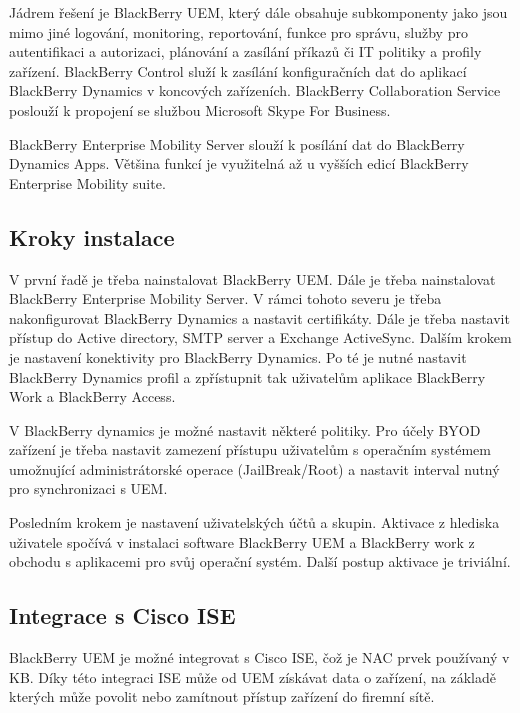 Jádrem řešení je BlackBerry UEM, který dále obsahuje subkomponenty jako jsou mimo jiné logování, monitoring, reportování, funkce pro správu, služby pro autentifikaci a autorizaci, plánování a zasílání příkazů či IT politiky a profily zařízení. BlackBerry Control služí k zasílání konfiguračních dat do aplikací BlackBerry Dynamics v koncových zařízeních. BlackBerry Collaboration Service poslouží k propojení se službou Microsoft Skype For Business. 

BlackBerry Enterprise Mobility Server slouží k posílání dat do BlackBerry Dynamics Apps. Většina funkcí je využitelná až u vyšších edicí BlackBerry Enterprise Mobility suite.

\subsection{Kroky instalace}
V první řadě je třeba nainstalovat BlackBerry UEM. Dále je třeba nainstalovat BlackBerry Enterprise Mobility Server. V rámci tohoto severu je třeba nakonfigurovat BlackBerry Dynamics a nastavit certifikáty.  Dále je třeba nastavit přístup do Active directory, SMTP server a Exchange ActiveSync. Dalším krokem je nastavení konektivity pro BlackBerry Dynamics. Po té je nutné nastavit BlackBerry Dynamics profil a zpřístupnit tak uživatelům aplikace BlackBerry Work a BlackBerry Access. 

V BlackBerry dynamics je možné nastavit některé politiky. Pro účely BYOD zařízení je třeba nastavit zamezení přístupu uživatelům s operačním systémem umožnující administrátorské operace (JailBreak/Root) a nastavit interval nutný pro synchronizaci s UEM.

Posledním krokem je nastavení uživatelských účtů a skupin. Aktivace z hlediska uživatele spočívá v instalaci software BlackBerry UEM a BlackBerry work z obchodu s aplikacemi pro svůj operační systém. Další postup aktivace je triviální.

\subsection{Integrace s Cisco ISE}


BlackBerry UEM je možné integrovat s Cisco ISE, čož je NAC prvek používaný v KB. Díky této integraci ISE může od UEM získávat data o zařízení, na základě kterých může povolit nebo zamítnout přístup zařízení do firemní sítě.

